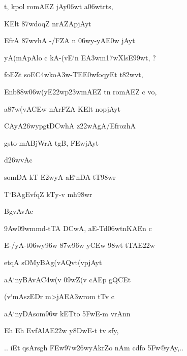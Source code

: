 {\dn t\4, kpol\? romAEZ jAy\306wt\? a\306wtr\?ts,{\dandabdn} \dontdisplaylinenum}

{\dn KElt\2 \387wdoq\?Z nrAZApjAyt\? \vegdn\dontdisplaylinenum}

{\dn EfrA \387wvhA -/FZA\2 n \306wy-yA\3E0w jAyt\?{\dandabdn} \dontdisplaylinenum}

{\dn yA(mApAlo c kA-(vE`n E\3A3wm\317wXls\2E\399wt, {\rs ?\re} \vegdn\dontdisplaylinenum}

{\dn foEZt\4 soE\3C4wko\3A3w-TE\3E0wfoqyEt t\382wvt,{\dandabdn} \dontdisplaylinenum}

{\dn Enb\388w\306w(yE\322wp\323wmAEZ t\?n romAEZ c \5vo, \vegdn\dontdisplaylinenum}

{\dn a\387w(vA\3CEw nArFZA\2 KElt\2 nopjAyt\?{\dandabdn} \dontdisplaylinenum}

{\dn CAyA\326wypgt\3DCw\?hA z\322wAgA/EfrozhA{\dandadn}\dontdisplaylinenum }

{\dn g\5sto-mABjWrA tgB\0, \3FEwjAyt\? \vegdn\dontdisplaylinenum}

{\dn d\?\326wvAc{\dandabdn}\dontdisplaylinenum }

{\dn somDA kT\2 \3E2w\?yA aE`nDA-tT\?\398wr{\dandadn} \dontdisplaylinenum}

{\dn {}T`BAgEvf\?q\?Z kTy-v mh\?\398wr \vegdn\dontdisplaylinenum}

{\dn BgvAvAc{\dandabdn}\dontdisplaylinenum }

{\dn \39Aw\?\309wmm\?d-tTA \3DCwA, aE-Td\306wtnKAEn c{\dandadn} \dontdisplaylinenum}

{\dn E-/yA-t\306wy\396w \387w\396w y\3CEw \398w\?t\2 tTAE\322w \vegdn\dontdisplaylinenum}

{\dn et\?qA\2 sOMyBAg(vAQv\?t(vpjAyt\?{\dandabdn} \dontdisplaylinenum}

{\dn aA`n\?yBAvA\3C4w(v\2 \309wZ(v\2 cAEp gQCEt \vegdn\dontdisplaylinenum}

{\dn (v`mA\2szEDr\2 m>jAE\3A3wrom tT\4v c{\dandabdn} \dontdisplaylinenum}

{\dn aA`n\?yDAsom\396w kETto \35FwE-m vrAnn\?{\dandadn}\dontdisplaylinenum }

{\dn {}\5Eh \5Eh EvfAlAE\322w y\38DwE-t tv s\2fy, \vegdn\dontdisplaylinenum}

{\dn 
\jump
\begin{center}
{..} iEt qsArs\2g\5h\? \3FEw\397w\326wyAkrZo nAm cd\0fo \35Fw@yAy,{..}
\end{center}\vers}
\bekveg\szamveg\vfill\phpspagebreak\szam\bek{}
\thispagestyle{empty}



